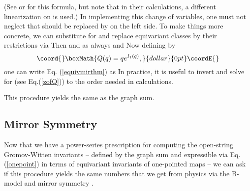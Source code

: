 \documentclass[a4paper,11pt]{article}
\providecommand{\PP}{{\mathbb{P}}}
\begin{document}
(See \cite{E} or \cite{LLY} for this formula, but note that in
their calculations, a different linearization on \myHighlight{$K_{\PP^2}$}\coordHE{}
is used.)
In implementing this change of variables,
one must not neglect that \coordHE{}
should be replaced by \coordHE{}
on the left side.
To make things more concrete, we can substitute
\coordHE{} for \coordHE{} and replace
equivariant classes by their restrictions via \coordHE{}
Then \coordHE{}  \coordHE{} and as always \coordHE{} and \coordHE{}
Now defining \coordHE{} by $$\coord{}\boxMath{Q(q) = qe^{I_1(q)},}{dollar}{0pt}\coordE{}$$
one can write Eq. \!(\ref{equivmirthm})
as \coordHE{}  In practice, it is useful
to invert and solve for \coordHE{} (see Eq.\!({\ref{zofQ}}))
to the order
needed in calculations.

This procedure yields the same \coordHE{} as the
graph sum.

\subsection{Mirror Symmetry}

Now that we have a power-series prescription for computing
the open-string Gromov-Witten invariants -- defined by the
graph sum and expressible via Eq. \!\!(\ref{onepoint})
in terms of equivariant invariants of
one-pointed maps -- we can ask if this procedure yields
the same numbers that we get from physics
via the B-model and mirror symmetry \cite{AV} \cite{AKV}.
\end{document}
